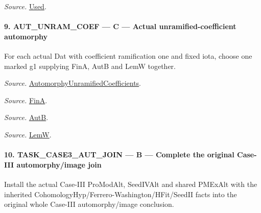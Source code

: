 \documentclass[11pt,a4paper]{article}
\numberwithin{equation}{section}
\theoremstyle{remark}\newtheorem{remark}[theorem]{Remark}
\begin{document}
\emph{Source.} \href{https://github.com/CocoSgt/riemann-hypothesis-lean/blob/7cbf7a0c32fca1badf05931879a37c3f8a2b03b4/src/Development/AutomorphicArithmetic/AutomorphicVarieties/ModularityArgument/KatoQuadraticCharacters/KatoTwoOfUseN.lean#L11-L41}{Used}.



\paragraph{9. AUT\_\allowbreak UNRAM\_\allowbreak COEF — C — Actual unramified-coefficient automorphy}

For each actual Dat with coefficient ramification one and fixed iota, choose one marked g1 supplying FinA, AutB and LemW together.

\emph{Source.} \href{https://github.com/CocoSgt/riemann-hypothesis-lean/blob/7cbf7a0c32fca1badf05931879a37c3f8a2b03b4/src/Development/AutomorphicArithmetic/AutomorphicVarieties/AutomorphicCases/AutomorphyUnramifiedCoefficients.lean#L24-L27}{AutomorphyUnramifiedCoefficients}.

\emph{Source.} \href{https://github.com/CocoSgt/riemann-hypothesis-lean/blob/7cbf7a0c32fca1badf05931879a37c3f8a2b03b4/src/Development/AutomorphicArithmetic/AutomorphicVarieties/AutomorphicCases/AutomorphyUnramifiedCoefficients.lean#L12-L13}{FinA}.

\emph{Source.} \href{https://github.com/CocoSgt/riemann-hypothesis-lean/blob/7cbf7a0c32fca1badf05931879a37c3f8a2b03b4/src/Development/AutomorphicArithmetic/AutomorphicVarieties/AutomorphicCases/AutomorphyUnramifiedCoefficients.lean#L15-L17}{AutB}.

\emph{Source.} \href{https://github.com/CocoSgt/riemann-hypothesis-lean/blob/7cbf7a0c32fca1badf05931879a37c3f8a2b03b4/src/Development/AutomorphicArithmetic/AutomorphicVarieties/AutomorphicCases/AutomorphyUnramifiedCoefficients.lean#L19-L22}{LemW}.



\paragraph{10. TASK\_\allowbreak CASE3\_\allowbreak AUT\_\allowbreak JOIN — B — Complete the original Case-III automorphy/image join}

Install the actual Case-III ProModAlt, SeedIVAlt and shared PMExAlt with the inherited CohomologyHyp/Ferrero-Washington/HFit/SeedII facts into the original whole Case-III automorphy/image conclusion.
\end{document}
